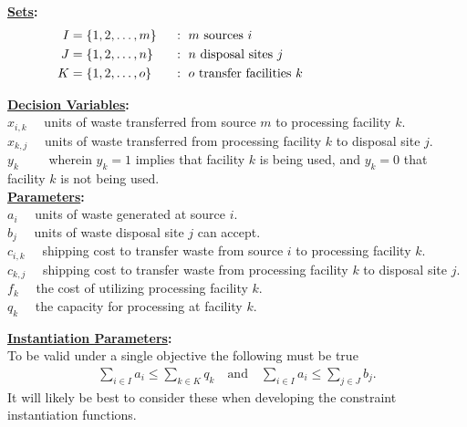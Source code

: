 \documentclass[12pt]{amsart}
\begin{document}
\textbf{\underline{Sets}:} 
\begin{alignat*}{2}
	I &= \{1,2,\ldots,m\}\ & &:\ m \text{ sources } i \hspace{30ex} \\
	J &= \{1,2,\ldots,n\}\ & &:\ n \text{ disposal sites } j  \\
	K &= \{1,2,\ldots,o\}\ & &:\ o \text{ transfer facilities } k 
\end{alignat*} 

\textbf{\underline{Decision Variables}:} \\ 

\noindent
\(x_{i,k}\quad\) units of waste transferred from source \(m\) to processing facility \(k\). \\
\(x_{k,j}\quad\) units of waste transferred from processing facility \(k\) to disposal site \(j\). \\
\(y_k\qquad\!\) wherein \(y_k=1\) implies that facility \(k\) is being used,
and \(y_k=0\) that facility \(k\) is not being used. \\

\textbf{\underline{Parameters}:} \\

\noindent
\(a_i\quad\) units of waste generated at source \(i\). \\
\(b_j\quad\) units of waste disposal site \(j\) can accept. \\
\(c_{i,k}\quad\) shipping cost to transfer waste from source \(i\) to processing facility \(k\). \\
\(c_{k,j}\quad\) shipping cost to transfer waste from processing facility \(k\) to disposal site \(j\). \\
\(f_k\quad\) the cost of utilizing processing facility \(k\). \\
\(q_k\quad\) the capacity for processing at facility \(k\). \\

\clearpage

\textbf{\underline{Instantiation Parameters}:} \\

\noindent
To be valid under a single objective the following must be true
\begin{align*}
	\sum_{i\in I}a_i \leq \sum_{k\in K}q_k \quad\text{and}\quad
	\sum_{i\in I}a_i \leq \sum_{j\in J}b_j .
\end{align*}
It will likely be best to consider these when developing the
constraint instantiation functions. \\
\end{document}
